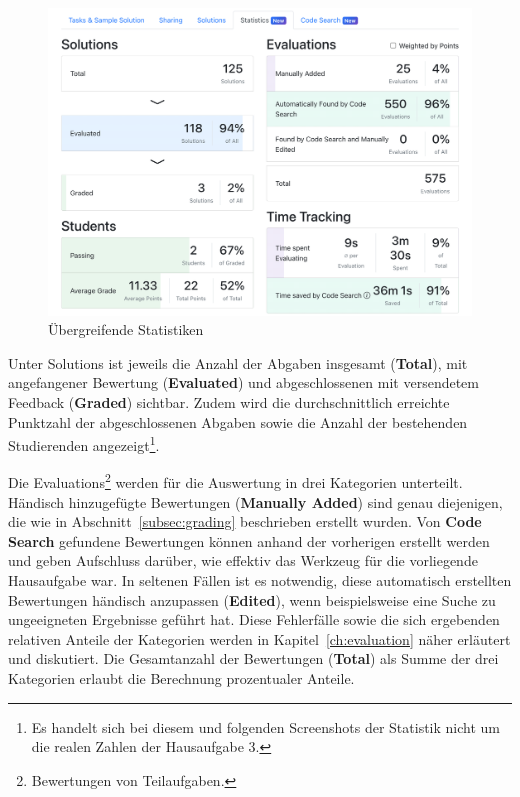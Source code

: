 \begin{figure}
    \centering
    \includegraphics[width=\textwidth]{images/assignment-statistics-basics}
    \caption{Übergreifende Statistiken}
    \label{fig:assignment-statistics-basics}
\end{figure}

Unter Solutions ist jeweils die Anzahl der Abgaben insgesamt (\textbf{Total}), mit angefangener Bewertung (\textbf{Evaluated}) und abgeschlossenen mit versendetem Feedback (\textbf{Graded}) sichtbar.
Zudem wird die durchschnittlich erreichte Punktzahl der abgeschlossenen Abgaben sowie die Anzahl der bestehenden Studierenden angezeigt\footnote{
    Es handelt sich bei diesem und folgenden Screenshots der Statistik nicht um die realen Zahlen der Hausaufgabe 3.
}.

Die Evaluations\footnote{
    Bewertungen von Teilaufgaben.
} werden für die Auswertung in drei Kategorien unterteilt.
Händisch hinzugefügte Bewertungen (\textbf{Manually Added}) sind genau diejenigen, die wie in Abschnitt~\ref{subsec:grading} beschrieben erstellt wurden.
Von \textbf{Code Search} gefundene Bewertungen können anhand der vorherigen erstellt werden und geben Aufschluss darüber, wie effektiv das Werkzeug für die vorliegende Hausaufgabe war.
In seltenen Fällen ist es notwendig, diese automatisch erstellten Bewertungen händisch anzupassen (\textbf{Edited}), wenn beispielsweise eine Suche zu ungeeigneten Ergebnisse geführt hat.
Diese Fehlerfälle sowie die sich ergebenden relativen Anteile der Kategorien werden in Kapitel~\ref{ch:evaluation} näher erläutert und diskutiert.
Die Gesamtanzahl der Bewertungen (\textbf{Total}) als Summe der drei Kategorien erlaubt die Berechnung prozentualer Anteile.

